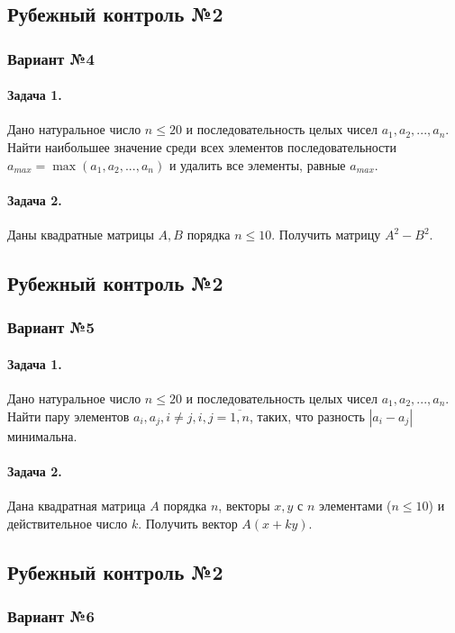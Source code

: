 \documentclass[12pt,a4paper]{report}
\begin{document}
\subsection*{Рубежный контроль №2}
\subsubsection*{Вариант №4}
\paragraph*{Задача 1.} Дано натуральное число $n \le 20$ и последовательность целых чисел $a_1, a_2, ..., a_n$. Найти наибольшее значение среди всех элементов последовательности $a_{max} = \max(a_1, a_2, ..., a_n)$ и удалить все элементы, равные $a_{max}$.
\paragraph*{Задача 2.} Даны квадратные матрицы $A, B$ порядка $n \le 10$. Получить матрицу $A^2-B^2$.

\subsection*{Рубежный контроль №2}
\subsubsection*{Вариант №5}
\paragraph*{Задача 1.} Дано натуральное число $n \le 20$ и последовательность целых чисел $a_1, a_2, ..., a_n$. Найти пару элементов $a_i, a_j, i \ne j, i,j=\overline{1,n}$, таких, что разность $|a_i-a_j|$ минимальна.
\paragraph*{Задача 2.} Дана квадратная матрица $A$ порядка $n$, векторы $x, y$ с $n$ элементами ($n \le 10$) и действительное число $k$. Получить вектор $A(x+ky)$.

\subsection*{Рубежный контроль №2}
\subsubsection*{Вариант №6}
\end{document}
